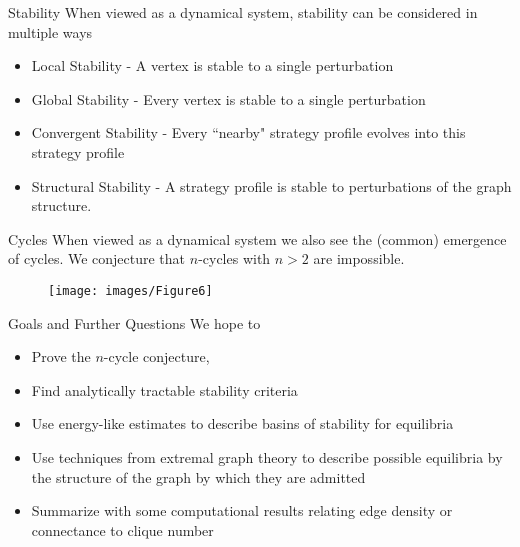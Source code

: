 \documentclass{beamer}
\begin{document}
\begin{frame}{Stability}
	When viewed as a dynamical system, stability can be considered in multiple ways 
	\begin{itemize}
		\item Local Stability - A vertex is stable to a single perturbation
		\item Global Stability - Every vertex is stable to a single perturbation
		\item Convergent Stability - Every ``nearby" strategy profile evolves into this strategy profile
		\item Structural Stability - A strategy profile is stable to perturbations of the graph structure. 
	\end{itemize}
\end{frame}

\begin{frame}{Cycles}
	When viewed as a dynamical system we also see the (common) emergence of cycles. We conjecture that $n$-cycles with $n>2$ are impossible. 
	\begin{figure}
	\texttt{[image: images/Figure6]}
	\end{figure} 
\end{frame}

\begin{frame}{Goals and Further Questions}
	We hope to 
	\begin{itemize}
		\item Prove the $n$-cycle conjecture,
		\item Find analytically tractable stability criteria
		\item Use energy-like estimates to describe basins of stability for equilibria
		\item Use techniques from extremal graph theory to describe possible equilibria by the structure of the graph by which they are admitted
		\item Summarize with some computational results relating edge density or connectance to clique number 
	\end{itemize}
\end{frame}
\end{document}
